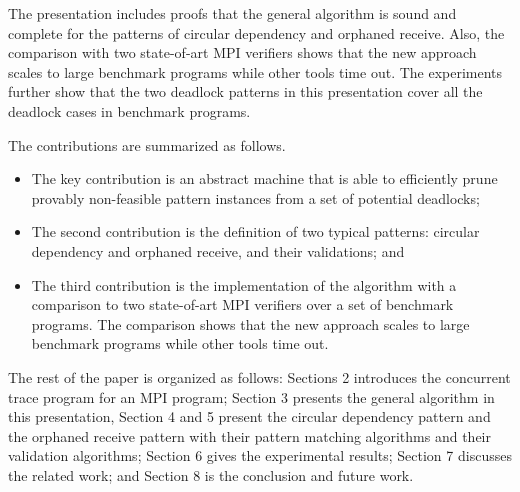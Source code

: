The presentation includes proofs that the general algorithm is sound and complete for the patterns of circular dependency and orphaned receive. Also, the comparison with two state-of-art MPI verifiers shows that the new approach scales to large benchmark programs while other tools time out. The experiments further show that the two deadlock patterns in this presentation cover all the deadlock cases in benchmark programs.


The contributions are summarized as follows.
\begin{itemize}
\item The key contribution is an abstract machine that is able to efficiently prune provably non-feasible pattern instances from a set of potential deadlocks; 
\item The second contribution is the definition of two typical patterns: circular dependency and orphaned receive, and their validations; and
\item The third contribution is the implementation of the algorithm with a comparison to two state-of-art MPI verifiers over a set of benchmark programs. The comparison shows that the new approach scales to large benchmark programs while other tools time out.
\end{itemize}


The rest of the paper is organized as follows: Sections 2 introduces the concurrent trace program for an MPI program; Section 3 presents the general algorithm in this presentation, Section 4 and 5 present the circular dependency pattern and the orphaned receive pattern with their pattern matching algorithms and their validation algorithms; Section 6 gives the experimental results; Section 7 discusses the related work; and Section 8 is the conclusion and future work.